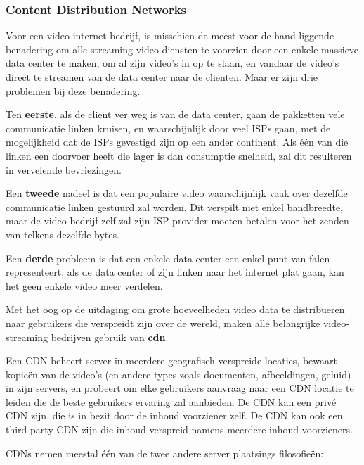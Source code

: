 \subsubsection{Content Distribution Networks}

\noindent Voor een video internet bedrijf, is misschien de meest voor de hand liggende benadering om alle streaming video diensten te voorzien door een enkele massieve data center te maken, om al zijn video’s in op te slaan, en vandaar de video’s direct te streamen van de data center naar de clienten. Maar er zijn drie problemen bij deze benadering.

\noindent Ten \textbf{eerste}, als de client ver weg is van de data  center, gaan de pakketten vele communicatie linken kruisen, en waarschijnlijk door veel ISPs gaan, met de mogelijkheid dat de ISPs gevestigd zijn op een ander continent. Als één van die linken een doorvoer heeft die lager is dan consumptie snelheid, zal dit resulteren in vervelende bevriezingen.

\noindent Een \textbf{tweede} nadeel is dat een populaire video waarschijnlijk vaak over dezelfde communicatie linken gestuurd zal worden. Dit verspilt niet enkel bandbreedte, maar de video bedrijf zelf zal zijn ISP provider moeten betalen voor het zenden van telkens dezelfde bytes.

Een \textbf{derde} probleem is dat een enkele data center een enkel punt van falen representeert, als de data center of zijn linken naar het internet plat gaan, kan het geen enkele video meer verdelen.

\noindent Met het oog op de uitdaging om grote hoeveelheden video data te distribueren naar gebruikers die verspreidt zijn over de wereld, maken alle belangrijke video-streaming bedrijven gebruik van \textbf{\acrfull{cdn}}. 

\noindent Een CDN beheert server in meerdere geografisch verspreide locaties, bewaart kopieën van de video’s (en andere types zoals documenten, afbeeldingen, geluid) in zijn servers, en probeert om elke gebruikers aanvraag naar een CDN locatie te leiden die de beste gebruikers ervaring zal aanbieden. De CDN kan een privé CDN zijn, die is in bezit door de inhoud voorziener zelf. De CDN kan ook een third-party CDN zijn die inhoud verspreid namens meerdere inhoud voorzieners.

\noindent CDNs nemen meestal één van de twee andere server plaatsings filosofieën:

